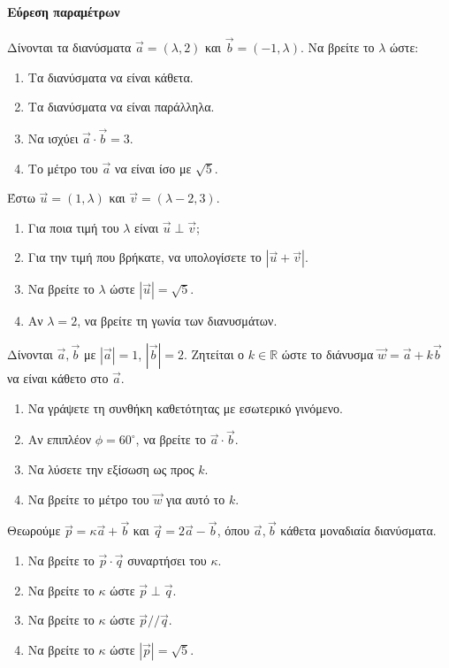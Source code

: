 \documentclass[11pt,a4paper,modern]{FFExercises}
\begin{document}
\paragraph{Εύρεση παραμέτρων}

\askhsh
Δίνονται τα διανύσματα $\vec{a}=(\lambda, 2)$ και $\vec{b}=(-1, \lambda)$. Να βρείτε το $\lambda$ ώστε:
\begin{enumerate}
    \item Τα διανύσματα να είναι κάθετα.
    \item Τα διανύσματα να είναι παράλληλα.
    \item Να ισχύει $\vec{a}\cdot\vec{b} = 3$.
    \item Το μέτρο του $\vec{a}$ να είναι ίσο με $\sqrt{5}$.
\end{enumerate}

\askhsh
Έστω $\vec{u}=(1, \lambda)$ και $\vec{v}=(\lambda-2, 3)$.
\begin{enumerate}
    \item Για ποια τιμή του $\lambda$ είναι $\vec{u} \perp \vec{v}$;
    \item Για την τιμή που βρήκατε, να υπολογίσετε το $|\vec{u}+\vec{v}|$.
    \item Να βρείτε το $\lambda$ ώστε $|\vec{u}|=\sqrt{5}$.
    \item Αν $\lambda=2$, να βρείτε τη γωνία των διανυσμάτων.
\end{enumerate}

\askhsh
Δίνονται $\vec{a}, \vec{b}$ με $|\vec{a}|=1$, $|\vec{b}|=2$. Ζητείται ο $k \in \mathbb{R}$ ώστε το διάνυσμα $\vec{w} = \vec{a} + k\vec{b}$ να είναι κάθετο στο $\vec{a}$.
\begin{enumerate}
    \item Να γράψετε τη συνθήκη καθετότητας με εσωτερικό γινόμενο.
    \item Αν επιπλέον $\phi=60^\circ$, να βρείτε το $\vec{a}\cdot\vec{b}$.
    \item Να λύσετε την εξίσωση ως προς $k$.
    \item Να βρείτε το μέτρο του $\vec{w}$ για αυτό το $k$.
\end{enumerate}

\askhsh
Θεωρούμε $\vec{p} = \kappa \vec{a} + \vec{b}$ και $\vec{q} = 2\vec{a} - \vec{b}$, όπου $\vec{a}, \vec{b}$ κάθετα μοναδιαία διανύσματα.
\begin{enumerate}
    \item Να βρείτε το $\vec{p}\cdot\vec{q}$ συναρτήσει του $\kappa$.
    \item Να βρείτε το $\kappa$ ώστε $\vec{p} \perp \vec{q}$.
    \item Να βρείτε το $\kappa$ ώστε $\vec{p} // \vec{q}$.
    \item Να βρείτε το $\kappa$ ώστε $|\vec{p}| = \sqrt{5}$.
\end{enumerate}
\end{document}
